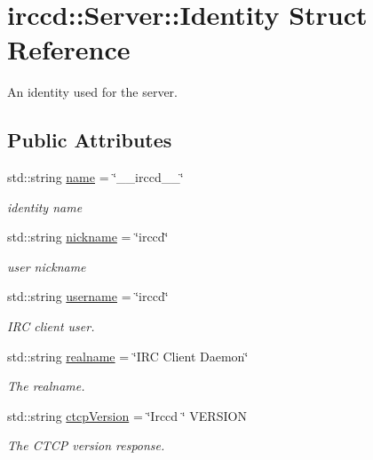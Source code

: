 \hypertarget{a00029}{\section{irccd\-:\-:Server\-:\-:Identity Struct Reference}
\label{a00029}
}


An identity used for the server.  


\subsection*{Public Attributes}
\begin{DoxyCompactItemize}
\item 
\hypertarget{a00029_ab1779f983c61d7c5a92be982207536f8}{std\-::string \hyperlink{a00029_ab1779f983c61d7c5a92be982207536f8}{name} = \char`\"{}\-\_\-\-\_\-irccd\-\_\-\-\_\-\char`\"{}}\label{a00029_ab1779f983c61d7c5a92be982207536f8}

\begin{DoxyCompactList}\small\item\em identity name \end{DoxyCompactList}\item 
\hypertarget{a00029_a9a19972dd99c2b5b636a50eb8b08a5e6}{std\-::string \hyperlink{a00029_a9a19972dd99c2b5b636a50eb8b08a5e6}{nickname} = \char`\"{}irccd\char`\"{}}\label{a00029_a9a19972dd99c2b5b636a50eb8b08a5e6}

\begin{DoxyCompactList}\small\item\em user nickname \end{DoxyCompactList}\item 
\hypertarget{a00029_a5a9b85cae566a84a515cdcf7bde96bc8}{std\-::string \hyperlink{a00029_a5a9b85cae566a84a515cdcf7bde96bc8}{username} = \char`\"{}irccd\char`\"{}}\label{a00029_a5a9b85cae566a84a515cdcf7bde96bc8}

\begin{DoxyCompactList}\small\item\em I\-R\-C client user. \end{DoxyCompactList}\item 
\hypertarget{a00029_ab98346e6b50665d3798c58b21e83f373}{std\-::string \hyperlink{a00029_ab98346e6b50665d3798c58b21e83f373}{realname} = \char`\"{}I\-R\-C Client Daemon\char`\"{}}\label{a00029_ab98346e6b50665d3798c58b21e83f373}

\begin{DoxyCompactList}\small\item\em The realname. \end{DoxyCompactList}\item 
\hypertarget{a00029_afc92e24cf7573d272c4139dfcfc40907}{std\-::string \hyperlink{a00029_afc92e24cf7573d272c4139dfcfc40907}{ctcp\-Version} = \char`\"{}Irccd \char`\"{} V\-E\-R\-S\-I\-O\-N}\label{a00029_afc92e24cf7573d272c4139dfcfc40907}

\begin{DoxyCompactList}\small\item\em The C\-T\-C\-P version response. \end{DoxyCompactList}\end{DoxyCompactItemize}



